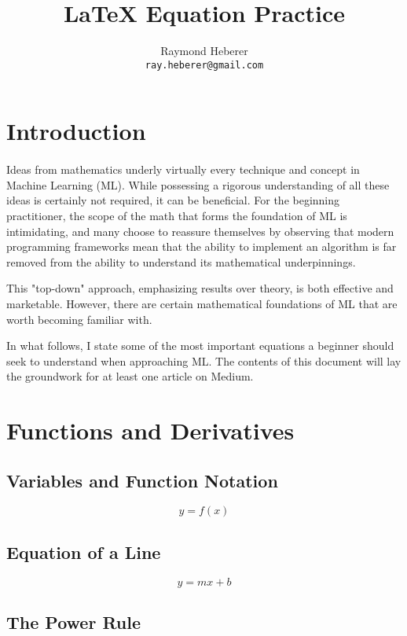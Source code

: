 \documentclass[a4paper]{article}
\title{LaTeX Equation Practice}
\author{Raymond Heberer\\
  \texttt{ray.heberer@gmail.com}}
\date{\displaydate{date}}
\begin{document}
\maketitle

\section{Introduction}

\paragraph{} Ideas from mathematics underly virtually every technique and concept in Machine Learning (ML). While possessing a rigorous understanding of all these ideas is certainly not required, it can be beneficial. For the beginning practitioner, the scope of the math that forms the foundation of ML is intimidating, and many choose to reassure themselves by observing that modern programming frameworks mean that the ability to implement an algorithm is far removed from the ability to understand its mathematical underpinnings. 

This "top-down" approach, emphasizing results over theory, is both effective and marketable. However, there are certain mathematical foundations of ML that are worth becoming familiar with.

In what follows, I state some of the most important equations a beginner should seek to understand when approaching ML. The contents of this document will lay the groundwork for at least one article on Medium.

\section{Functions and Derivatives}

\subsection{Variables and Function Notation}

$$ y = f(x) $$

\subsection{Equation of a Line}

$$ y = mx + b $$

\subsection{The Power Rule}
\end{document}
